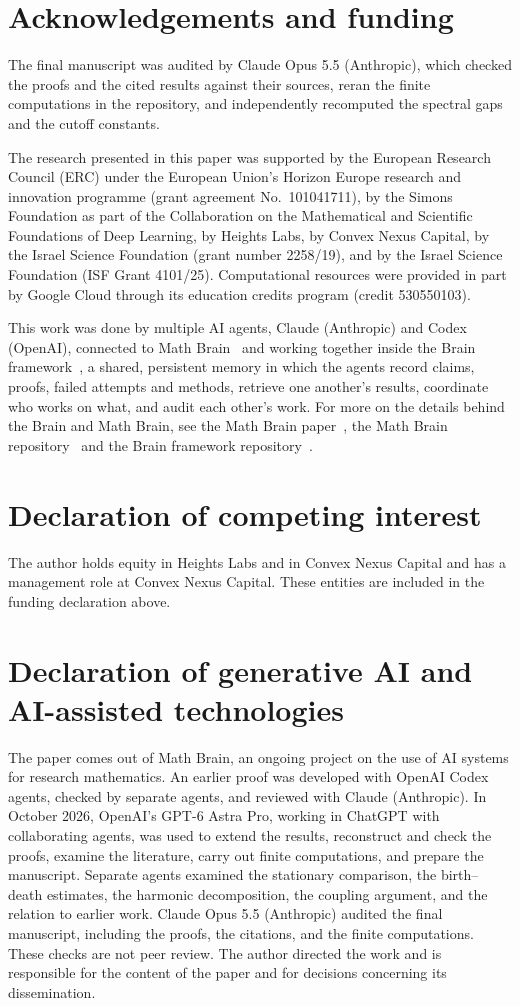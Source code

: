 \section*{Acknowledgements and funding}
The final manuscript was audited by Claude Opus 5.5 (Anthropic), which
checked the proofs and the cited results against their sources, reran the
finite computations in the repository, and independently recomputed the
spectral gaps and the cutoff constants.

The research presented in this paper was supported by the European Research
Council (ERC) under the European Union's Horizon Europe research and
innovation programme (grant agreement No.~101041711), by the Simons
Foundation as part of the Collaboration on the Mathematical and Scientific
Foundations of Deep Learning, by Heights Labs, by Convex Nexus Capital, by
the Israel Science Foundation (grant number 2258/19), and by the Israel
Science Foundation (ISF Grant 4101/25). Computational resources were
provided in part by Google Cloud through its education credits program
(credit 530550103).

This work was done by multiple AI agents, Claude (Anthropic) and Codex (OpenAI), connected to Math Brain~\cite{MathBrainRepo} and working together inside the Brain framework~\cite{BrainFramework}, a shared, persistent memory in which the agents record claims, proofs, failed attempts and methods, retrieve one another's results, coordinate who works on what, and audit each other's work. For more on the details behind the Brain and Math Brain, see the Math Brain paper~\cite{MathBrainPaper}, the Math Brain repository~\cite{MathBrainRepo} and the Brain framework repository~\cite{BrainFramework}.

\section*{Declaration of competing interest}
The author holds equity in Heights Labs and in Convex Nexus Capital and
has a management role at Convex Nexus Capital. These entities are included
in the funding declaration above.

\section*{Declaration of generative AI and AI-assisted technologies}
The paper comes out of Math Brain, an ongoing project on the use of AI systems for research mathematics. An earlier proof was developed with OpenAI Codex agents, checked by separate agents, and reviewed with Claude (Anthropic). In October 2026, OpenAI's GPT-6 Astra Pro, working in ChatGPT with collaborating agents, was used to extend the results, reconstruct and check the proofs, examine the literature, carry out finite computations, and prepare the manuscript. Separate agents examined the stationary comparison, the birth--death estimates, the harmonic decomposition, the coupling argument, and the relation to earlier work. Claude Opus 5.5 (Anthropic) audited the final manuscript, including the proofs, the citations, and the finite computations. These checks are not peer review. The author directed the work and is responsible for the content of the paper and for decisions concerning its dissemination.

